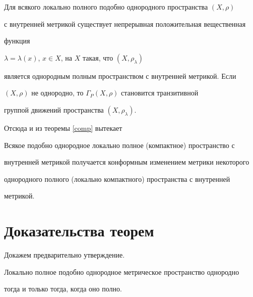 \begin{thms}


\label{main}


Для всякого локально полного подобно однородного пространства $(X, \rho)$


с внутренней метрикой существует непрерывная положительная вещественная


функция


$\lambda = \lambda(x)$, $x \in X$, на $X$ такая, что $(X,\rho_{\lambda})$


является однородным полным пространством с внутренней метрикой. Если


$(X,\rho)$ не однородно, то $\Gamma_{P}(X,\rho)$ становится транзитивной


группой движений пространства $(X,\rho_{\lambda})$.


\end{thms}





Отсюда и из теоремы \ref{comp} вытекает





\begin{cors}


\label{om}


Всякое подобно однородное локально полное (компактное) пространство с


внутренней метрикой получается конформным изменением метрики некоторого


однородного полного (локально компактного) пространства с внутренней


метрикой.


\end{cors}











\section{Доказательства теорем}





Докажем предварительно утверждение.





\begin{thms}


\label{comp} 


Локально полное подобно однородное метрическое пространство однородно


тогда и только тогда, когда оно полно.


\end{thms}





